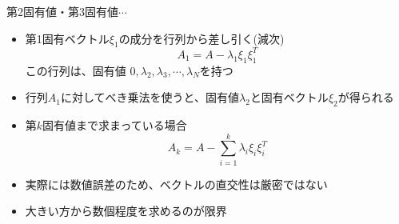 \begin{frame}[t,fragile]{第2固有値・第3固有値$\cdots$}
  \begin{itemize}
  \item 第1固有ベクトル$\xi_1$の成分を行列から差し引く(減次)
    \[
    A_1 = A - \lambda_1 \xi_1 \xi_1^T
    \]
    この行列は、固有値 $0,\lambda_2,\lambda_3,\cdots,\lambda_N$を持つ
  \item 行列$A_1$に対してべき乗法を使うと、固有値$\lambda_2$と固有ベクトル$\xi_2$が得られる
  \item 第$k$固有値まで求まっている場合
    \[
    A_k = A - \sum_{i=1}^k \lambda_i \xi_i \xi_i^T
    \]
  \item 実際には数値誤差のため、ベクトルの直交性は厳密ではない
  \item 大きい方から数個程度を求めるのが限界
  \end{itemize}
\end{frame}
